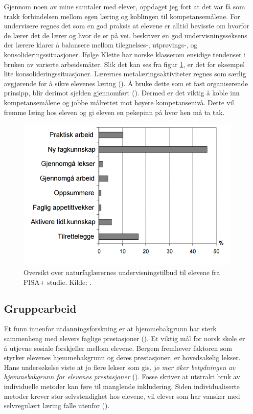 \documentclass[main.tex]{subfiles}
\begin{document}
Gjennom noen av mine samtaler med elever, oppdaget jeg fort at det var få som trakk forbindelsen mellom egen læring og koblingen til kompetansemålene. For undervisere regnes det som en god praksis at elevene er alltid bevisste om hvorfor de lærer det de lærer og hvor de er på vei.  beskriver en god undervisningsseksens der lærere klarer å balansere mellom tilegnelses-, utprøvings-, og konsolideringssituasjoner. Ifølge Klette har norske klasserom ensidige tendenser i bruken av varierte arbeidsmåter. Slik det kan ses fra figur \ref{fig:odeg10}, er det for eksempel lite konsolideringssituasjoner. Lærernes metalæringsaktiviteter regnes som særlig avgjørende for å sikre elevenes læring (). Å bruke dette som et fast organiserende prinsipp, blir derimot sjelden gjennomført (). Dermed er det viktig å koble inn kompetansemålene og jobbe målrettet mot høyere kompetansenivå. Dette vil fremme læing hos eleven og gi eleven en pekepinn på hvor hen må ta tak.
\begin{figure}[h!]
\includegraphics[scale = 0.6]{../figures/undervisnings_aktivitet.png}
\caption{Oversikt over naturfaglærernes undervisningstilbud til elevene fra PISA+ studie. Kilde: 
\protect{}.}
\label{fig:odeg10}
\end{figure}



\subsection*{Gruppearbeid}

Et funn innenfor utdanningsforskning er at hjemmebakgrunn har sterk sammenheng med elevers faglige prestasjoner (). Et viktig mål for norsk skole er å utjevne sosiale forskjeller mellom elevene. Bergem fremhever faktoren som styrker elevenes hjemmebakgrunn og deres prestasjoner, er hovedsakelig lekser. Hans undersøkelse viste at jo flere lekser som gis, \emph{jo mer øker betydningen av hjemmebakgrunn for elevenes prestasjoner} (). Fosse skriver at utstrakt bruk av individuelle metoder kan føre til manglende inkludering. Siden individualiserte metoder krever stor selvstendighet hos elevene, vil elever som har vansker med selvregulært læring falle utenfor (). 
\end{document}
